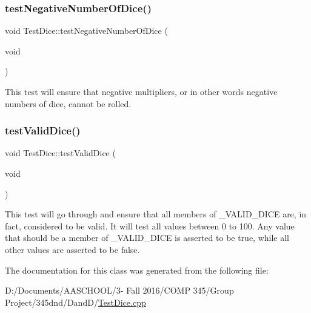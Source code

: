 \subsubsection{\texorpdfstring{test\+Negative\+Number\+Of\+Dice()}{testNegativeNumberOfDice()}}
{\footnotesize\ttfamily void Test\+Dice\+::test\+Negative\+Number\+Of\+Dice (\begin{DoxyParamCaption}\item[{void}]{ }\end{DoxyParamCaption})\hspace{0.3cm}{\ttfamily [protected]}}

This test will ensure that negative multipliers, or in other words negative numbers of dice, cannot be rolled. \hypertarget{class_test_dice_a7a6a244b7820f9638b424ff16f3bb602}{}\label{class_test_dice_a7a6a244b7820f9638b424ff16f3bb602} 
\subsubsection{\texorpdfstring{test\+Valid\+Dice()}{testValidDice()}}
{\footnotesize\ttfamily void Test\+Dice\+::test\+Valid\+Dice (\begin{DoxyParamCaption}\item[{void}]{ }\end{DoxyParamCaption})\hspace{0.3cm}{\ttfamily [protected]}}

This test will go through and ensure that all members of \+\_\+\+V\+A\+L\+I\+D\+\_\+\+D\+I\+CE are, in fact, considered to be valid. It will test all values between 0 to 100. Any value that should be a member of \+\_\+\+V\+A\+L\+I\+D\+\_\+\+D\+I\+CE is asserted to be true, while all other values are asserted to be false. 

The documentation for this class was generated from the following file\+:\begin{DoxyCompactItemize}
\item 
D\+:/\+Documents/\+A\+A\+S\+C\+H\+O\+O\+L/3-\/ Fall 2016/\+C\+O\+M\+P 345/\+Group Project/345dnd/\+Dand\+D/\hyperlink{_test_dice_8cpp}{Test\+Dice.\+cpp}\end{DoxyCompactItemize}
